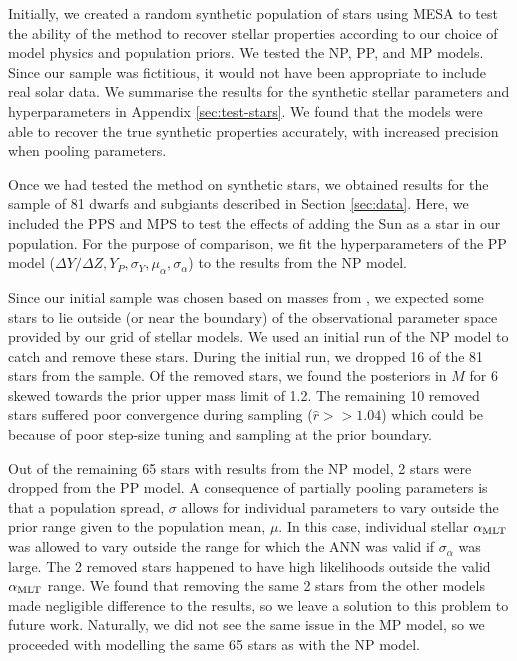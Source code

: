Initially, we created a random synthetic population of stars using \textsc{MESA} to test the ability of the method to recover stellar properties according to our choice of model physics and population priors. We tested the NP, PP, and MP models. Since our sample was fictitious, it would not have been appropriate to include real solar data. We summarise the results for the synthetic stellar parameters and hyperparameters in Appendix \ref{sec:test-stars}. We found that the models were able to recover the true synthetic properties accurately, with increased precision when pooling parameters.

Once we had tested the method on synthetic stars, we obtained results for the sample of 81 dwarfs and subgiants described in Section \ref{sec:data}. Here, we included the PPS and MPS to test the effects of adding the Sun as a star in our population. For the purpose of comparison, we fit the hyperparameters of the PP model ($\Delta Y/\Delta Z, Y_P, \sigma_Y, \mu_\alpha, \sigma_\alpha$) to the results from the NP model.

Since our initial sample was chosen based on masses from , we expected some stars to lie outside (or near the boundary) of the observational parameter space provided by our grid of stellar models. We used an initial run of the NP model to catch and remove these stars. During the initial run, we dropped 16 of the 81 stars from the sample. Of the removed stars, we found the posteriors in $M$ for 6 skewed towards the prior upper mass limit of \SI{1.2}{\solarmass}. The remaining 10 removed stars suffered poor convergence during sampling ($\hat{r} >> 1.04$) which could be because of poor step-size tuning and sampling at the prior boundary.

Out of the remaining 65 stars with results from the NP model, 2 stars were dropped from the PP model. A consequence of partially pooling parameters is that a population spread, $\sigma$ allows for individual parameters to vary outside the prior range given to the population mean, $\mu$. In this case, individual stellar ${\alpha_\mathrm{MLT}}$ was allowed to vary outside the range for which the ANN was valid if $\sigma_\alpha$ was large. The 2 removed stars happened to have high likelihoods outside the valid ${\alpha_\mathrm{MLT}}$ range. We found that removing the same 2 stars from the other models made negligible difference to the results, so we leave a solution to this problem to future work. Naturally, we did not see the same issue in the MP model, so we proceeded with modelling the same 65 stars as with the NP model.

